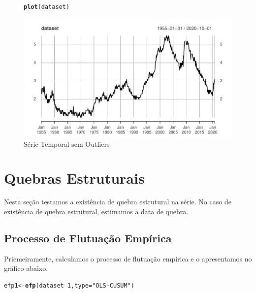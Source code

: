 \documentclass{article}\usepackage[]{graphicx}\usepackage[]{color}
\makeatletter
\def\maxwidth{ %
  \ifdim\Gin@nat@width>\linewidth
    \linewidth
  \else
    \Gin@nat@width
  \fi
}
\newcommand{\hlnum}[1]{\textcolor[rgb]{0.686,0.059,0.569}{#1}}%
\newcommand{\hlstr}[1]{\textcolor[rgb]{0.192,0.494,0.8}{#1}}%
\newcommand{\hlopt}[1]{\textcolor[rgb]{0,0,0}{#1}}%
\newcommand{\hlstd}[1]{\textcolor[rgb]{0.345,0.345,0.345}{#1}}%
\newcommand{\hlkwb}[1]{\textcolor[rgb]{0.69,0.353,0.396}{#1}}%
\newcommand{\hlkwc}[1]{\textcolor[rgb]{0.333,0.667,0.333}{#1}}%
\newcommand{\hlkwd}[1]{\textcolor[rgb]{0.737,0.353,0.396}{\textbf{#1}}}%
\newenvironment{kframe}{%
 \def\at@end@of@kframe{}%
 \ifinner\ifhmode%
  \def\at@end@of@kframe{\end{minipage}}%
  \begin{minipage}{\columnwidth}%
 \fi\fi%
 \def\FrameCommand##1{\hskip\@totalleftmargin \hskip-\fboxsep
 \colorbox{shadecolor}{##1}\hskip-\fboxsep
     \hskip-\linewidth \hskip-\@totalleftmargin \hskip\columnwidth}%
 \MakeFramed {\advance\hsize-\width
   \@totalleftmargin\z@ \linewidth\hsize
   \@setminipage}}%
 {\par\unskip\endMakeFramed%
 \at@end@of@kframe}
\newenvironment{knitrout}{}{} %
\makeatother
\begin{document}
    \begin{figure}[H]
    \caption{Série Temporal sem Outliers}
    \centering
\begin{knitrout}
\color{fgcolor}\begin{kframe}
\begin{alltt}
\hlkwd{plot}\hlstd{(dataset)}
\end{alltt}
\end{kframe}
\includegraphics[width=\maxwidth]{figure/unnamed-chunk-21-1} 

\end{knitrout}
    \end{figure}


\section{Quebras Estruturais}

    Nesta seção testamos a existência de quebra estrutural na série. No caso de existência de quebra estrutural, estimamos a data de quebra.

    \subsection{Processo de Flutuação Empírica}
    
        Priemeiramente, calculamos o processo de flutuação empírica e o apresentamos no gráfico abaixo.
    
\begin{knitrout}
\color{fgcolor}\begin{kframe}
\begin{alltt}
\hlstd{efp1} \hlkwb{<-} \hlkwd{efp}\hlstd{(dataset}\hlopt{~}\hlnum{1}\hlstd{,} \hlkwc{type}\hlstd{=}\hlstr{"OLS-CUSUM"}\hlstd{)}
\end{alltt}
\end{kframe}
\end{knitrout}
\end{document}
